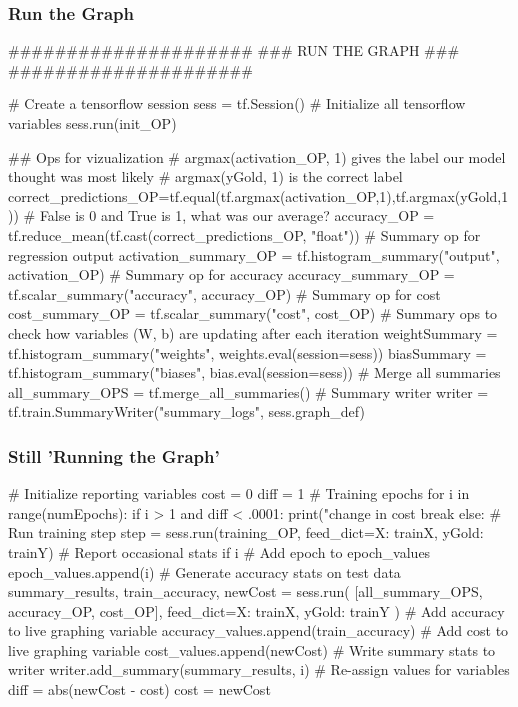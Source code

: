 \documentclass[14pt]{beamer}
\begin{document}
\begin{frame}[fragile]
  \frametitle{Run the Graph}
  \begin{python}
#####################
### RUN THE GRAPH ###
#####################

# Create a tensorflow session
sess = tf.Session()
# Initialize all tensorflow variables
sess.run(init_OP)

## Ops for vizualization
# argmax(activation_OP, 1) gives the label our model thought was most likely
# argmax(yGold, 1) is the correct label
correct_predictions_OP=tf.equal(tf.argmax(activation_OP,1),tf.argmax(yGold,1))
# False is 0 and True is 1, what was our average?
accuracy_OP = tf.reduce_mean(tf.cast(correct_predictions_OP, "float"))
# Summary op for regression output
activation_summary_OP = tf.histogram_summary("output", activation_OP)
# Summary op for accuracy
accuracy_summary_OP = tf.scalar_summary("accuracy", accuracy_OP)
# Summary op for cost
cost_summary_OP = tf.scalar_summary("cost", cost_OP)
# Summary ops to check how variables (W, b) are updating after each iteration
weightSummary = tf.histogram_summary("weights", weights.eval(session=sess))
biasSummary = tf.histogram_summary("biases", bias.eval(session=sess))
# Merge all summaries
all_summary_OPS = tf.merge_all_summaries()
# Summary writer
writer = tf.train.SummaryWriter("summary_logs", sess.graph_def)
  \end{python}
\end{frame}

\begin{frame}[fragile]
  \frametitle{Still 'Running the Graph'}
  \begin{python}
# Initialize reporting variables
cost = 0
diff = 1
# Training epochs
for i in range(numEpochs):
    if i > 1 and diff < .0001:
        print("change in cost %
        break
    else:
        # Run training step
        step = sess.run(training_OP, feed_dict={X: trainX, yGold: trainY})
        # Report occasional stats
        if i %
            # Add epoch to epoch_values
            epoch_values.append(i)
            # Generate accuracy stats on test data
            summary_results, train_accuracy, newCost = sess.run(
                [all_summary_OPS, accuracy_OP, cost_OP], 
                feed_dict={X: trainX, yGold: trainY}
            )
            # Add accuracy to live graphing variable
            accuracy_values.append(train_accuracy)
            # Add cost to live graphing variable
            cost_values.append(newCost)
            # Write summary stats to writer
            writer.add_summary(summary_results, i)
            # Re-assign values for variables
            diff = abs(newCost - cost)
            cost = newCost
  \end{python}
\end{frame}
\end{document}
